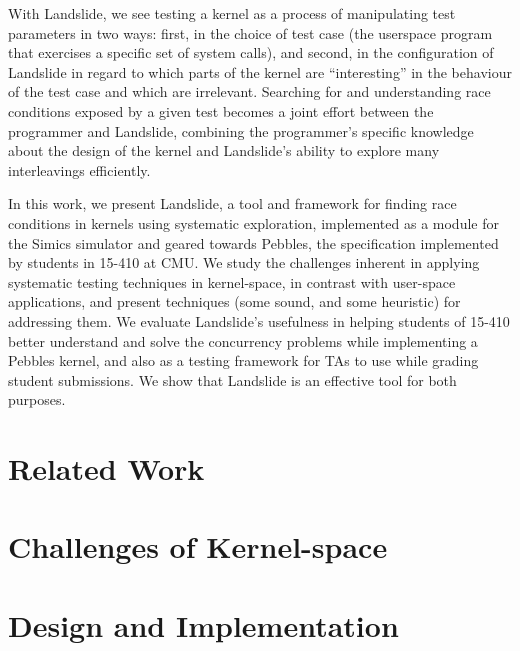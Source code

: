 \documentclass[twocolumn]{article}
\begin{document}
With Landslide, we see testing a kernel as a process of manipulating test parameters in two ways: first, in the choice of test case (the userspace program that exercises a specific set of system calls), and second, in the configuration of Landslide in regard to which parts of the kernel are ``interesting'' in the behaviour of the test case and which are irrelevant.
Searching for and understanding race conditions exposed by a given test becomes a joint effort between the programmer and Landslide, combining the programmer's specific knowledge about the design of the kernel and Landslide's ability to explore many interleavings efficiently.

In this work, we present Landslide, a tool and framework for finding race conditions in kernels using systematic exploration, implemented as a module for the Simics simulator and geared towards Pebbles, the specification implemented by students in 15-410 at CMU.
We study the challenges inherent in applying systematic testing techniques in kernel-space, in contrast with user-space applications, and present techniques (some sound, and some heuristic) for addressing them.
We evaluate Landslide's usefulness in helping students of 15-410 better understand and solve the concurrency problems while implementing a Pebbles kernel, and also as a testing framework for TAs to use while grading student submissions.
We show that Landslide is an effective tool for both purposes.

\section{Related Work}

\section{Challenges of Kernel-space}

\section{Design and Implementation}
\end{document}
